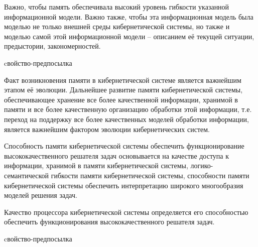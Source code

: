 Важно, чтобы память обеспечивала высокий уровень гибкости указанной информационной модели.
Важно также, чтобы эта информационная модель была моделью не только внешней среды кибернетической системы, но также и моделью самой этой информационной модели – описанием её текущей ситуации, предыстории, закономерностей.

\begin{SCn}
\begin{scnrelfromlist}{cвойство-предпосылка}
\end{scnrelfromlist}
\end{SCn}

Факт возникновения памяти в кибернетической системе является важнейшим этапом её эволюции.
Дальнейшее развитие памяти кибернетической системы, обеспечивающее хранение все более качественной информации, хранимой в памяти и все более качественную организацию обработки этой информации, т.е. переход на поддержку все более качественных моделей обработки информации, является важнейшим фактором эволюции кибернетических систем.

Способность памяти кибернетической системы обеспечить функционирование высококачественного решателя задач основывается на качестве доступа к информации, хранимой в памяти кибернетической системы, логико-семантической гибкости памяти кибернетической системы, способности памяти кибернетической системы обеспечить интерпретацию широкого многообразия моделей решения задач.

Качество процессора кибернетической системы определяется его способностью обеспечить функционирования высококачественного решателя задач.

\begin{SCn}
\begin{scnrelfromlist}{cвойство-предпосылка}
\end{scnrelfromlist}
\end{SCn}

